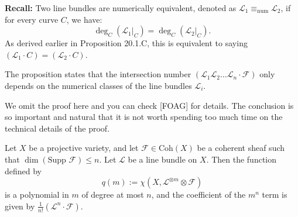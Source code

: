 \begin{proposition}[20.1.6]
\textbf{Recall:} Two line bundles are numerically equivalent, denoted as $\mathcal{L}_1 \equiv_{\text{num}} \mathcal{L}_2$, if for every curve $C$, we have:
\[
\deg_C(\mathcal{L}_1|_C) = \deg_C(\mathcal{L}_2|_C).
\]
As derived earlier in Proposition 20.1.C, this is equivalent to saying $(\mathcal{L}_1 \cdot C) = (\mathcal{L}_2 \cdot C)$.

The proposition states that the intersection number $(\mathcal{L}_1 \mathcal{L}_2 \dots \mathcal{L}_n \cdot \mathcal{F})$ only depends on the numerical classes of the line bundles $\mathcal{L}_i$.
\end{proposition}

\begin{remark}
    We omit the proof here and you can check [FOAG] for details. The conclusion is so important and natural that it is not worth spending too much time on the technical details of the proof.
\end{remark}

\begin{theorem}
Let $X$ be a projective variety, and let $\mathcal{F} \in \text{Coh}(X)$ be a coherent sheaf such that $\dim(\text{Supp } \mathcal{F}) \leq n$. Let $\mathcal{L}$ be a line bundle on $X$. Then the function defined by
\[
q(m) := \chi(X, \mathcal{L}^{\otimes m} \otimes \mathcal{F})
\]
is a polynomial in $m$ of degree at most $n$, and the coefficient of the $m^n$ term is given by $\frac{1}{n!} (\mathcal{L}^n \cdot \mathcal{F})$.
\end{theorem}

